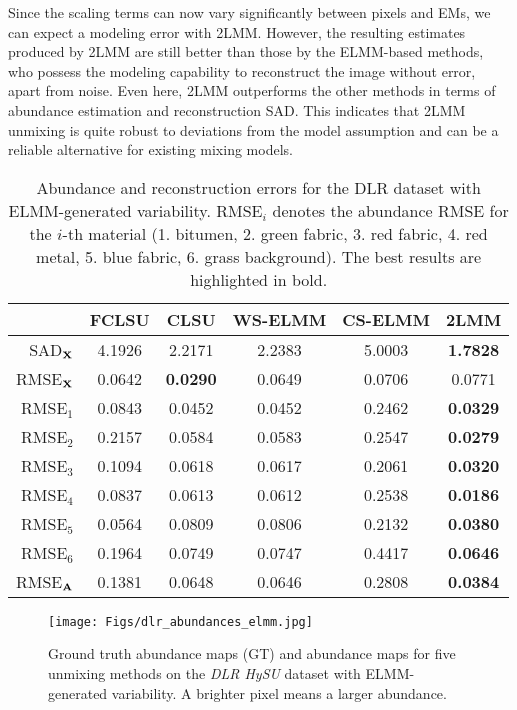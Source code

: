 Since the scaling terms can now vary significantly between pixels and EMs, we can expect a modeling error with 2LMM. However, the resulting estimates produced by 2LMM are still better than those by the ELMM-based methods, who possess the modeling capability to reconstruct the image without error, apart from noise. Even here, 2LMM outperforms the other methods in terms of abundance estimation and reconstruction SAD. This indicates that 2LMM unmixing is quite robust to deviations from the model assumption and can be a reliable alternative for existing mixing models.

\begin{table}[htb!]
    \caption{Abundance and reconstruction errors for the DLR dataset with ELMM-generated variability.  $\mathrm{RMSE}_i$ denotes the abundance RMSE for the $i$-th material (1. bitumen, 2. green fabric, 3. red fabric, 4. red metal, 5. blue fabric, 6. grass background). The best results are highlighted in bold.}
    \centering
        \begin{tabular}{r|ccccc|}
        \cline{2-6}
        \multicolumn{1}{l|}{}            & FCLSU  & CLSU            & WS-ELMM  & CS-ELMM  & 2LMM    \\ \hline \hline
        \multicolumn{1}{|r|}{SAD$_{\mathbf{X}}$}   & 4.1926 & 2.2171          & 2.2383   & 5.0003   & \textbf{1.7828}   \\ \hline
        \multicolumn{1}{|r|}{RMSE$_{\mathbf{X}}$}  & 0.0642 & \textbf{0.0290} & 0.0649   & 0.0706   & 0.0771   \\ \hline \hline
        \multicolumn{1}{|r|}{RMSE$_1$}   & 0.0843 & 0.0452          & 0.0452   & 0.2462   & \textbf{0.0329} \\ \hline
        \multicolumn{1}{|r|}{RMSE$_2$}   & 0.2157 & 0.0584          & 0.0583   & 0.2547   & \textbf{0.0279} \\ \hline
        \multicolumn{1}{|r|}{RMSE$_3$}   & 0.1094 & 0.0618          & 0.0617   & 0.2061   & \textbf{0.0320} \\ \hline
        \multicolumn{1}{|r|}{RMSE$_4$}   & 0.0837 & 0.0613          & 0.0612   & 0.2538   & \textbf{0.0186} \\ \hline
        \multicolumn{1}{|r|}{RMSE$_5$}   & 0.0564 & 0.0809          & 0.0806   & 0.2132   & \textbf{0.0380} \\ \hline
        \multicolumn{1}{|r|}{RMSE$_6$}   & 0.1964 & 0.0749          & 0.0747   & 0.4417   & \textbf{0.0646} \\ \hline \hline
        \multicolumn{1}{|r|}{RMSE$_{\mathbf{A}}$}  & 0.1381 & 0.0648          & 0.0646   & 0.2808   & \textbf{0.0384} \\ \hline
        \end{tabular}
    \label{tab: dlr elmm abundances}
\end{table}

\begin{figure}[t]
    \centering
    \texttt{[image: Figs/dlr\_abundances\_elmm.jpg]}
    \caption{Ground truth abundance maps (GT) and abundance maps for five unmixing methods on the \textit{DLR HySU} dataset with ELMM-generated variability. A brighter pixel means a larger abundance.}
    \label{fig: dlr elmm abundances}
\end{figure}